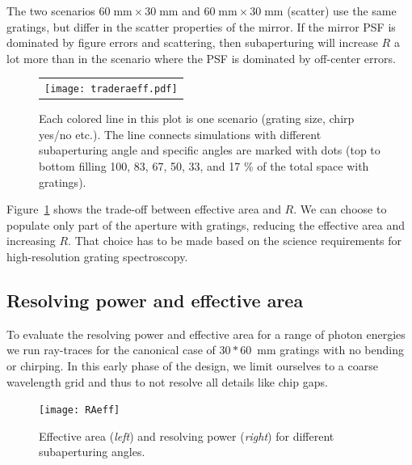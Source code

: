\documentclass[12pt]{spieman}  %
\begin{document}
\begin{spacing}{1}
The two scenarios $60\;\mathrm{mm}\times 30\;\mathrm{mm}$ and $60\;\mathrm{mm}\times 30\;\mathrm{mm}$ (scatter) use the same gratings, but differ in the scatter properties of the mirror. If the mirror PSF is dominated by figure errors and scattering, then subaperturing will increase $R$ a lot more than in the scenario where the PSF is dominated by off-center errors.

\begin{figure} [ht]
  \begin{center}
  \begin{tabular}{c} %
  \texttt{[image: traderaeff.pdf]}
  \end{tabular}
  \end{center}
  \caption {\label{fig:trade}
  Each colored line in this plot is one scenario (grating size, chirp yes/no etc.). The line connects simulations with different subaperturing angle and specific angles are marked with dots (top to bottom filling 100, 83, 67, 50, 33, and 17 \% of the total space with gratings).
  }
\end{figure}

Figure~\ref{fig:trade} shows the trade-off between effective area and $R$. We can choose to populate only part of the aperture with gratings, reducing the effective area and increasing $R$. That choice has to be made based on the science requirements for high-resolution grating spectroscopy.

\subsection{Resolving power and effective area}
To evaluate the resolving power and effective area for a range of photon energies we run ray-traces for the canonical case of $30 * 60$~mm gratings with no bending or chirping. In this early phase of the design, we limit ourselves to a coarse wavelength grid and thus to not resolve all details like chip gaps.

\begin{figure} [ht]
  \begin{center}
  \texttt{[image: RAeff]}
  \end{center}
  \caption {\label{fig:RAeff}
    Effective area (\emph{left}) and resolving power (\emph{right}) for different subaperturing angles.
  }
\end{figure}


\end{spacing}
\end{document}
